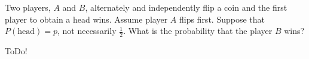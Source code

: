 
\begin{exercise}

Two players, $A$ and $B$, alternately and independently flip a coin and the first player to obtain a head wins.
Assume player $A$ flips first.
Suppose that $P(\text{head}) = p$, not necessarily $\frac{1}{2}$.
What is the probability that the player $B$ wins?

\end{exercise}


\begin{solution}

ToDo!

\end{solution}

